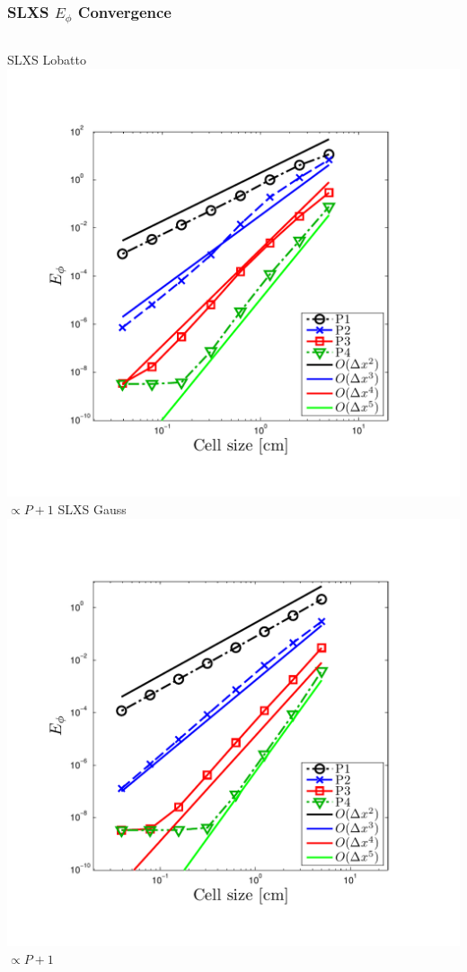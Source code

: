 \documentclass{beamer}
\begin{document}
\begin{frame}
\frametitle{SLXS $E_{\phi}$ Convergence}
\begin{columns}[t]
\centering
SLXS Lobatto
\includegraphics[width=\textwidth,trim=0.25in  0.2in 0.75in 0.5in,clip=true]{../chapter6_grey_radtran/Dissertation_Data/MMS3_SLXS_Lobatto_phi_L2.pdf}
\\
$\propto P+1$
\centering
SLXS Gauss
\includegraphics[width=\textwidth,trim=0.25in  0.2in 0.75in 0.5in,clip=true]{../chapter6_grey_radtran/Dissertation_Data/MMS3_SLXS_Gauss_phi_L2.pdf}
\\
$\propto P+1$
\end{columns}
\end{frame}
\end{document}
